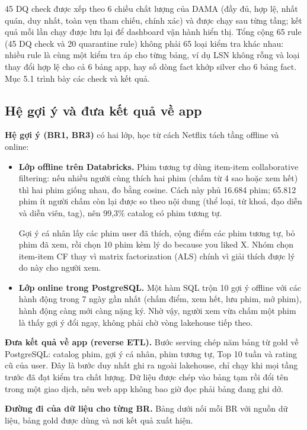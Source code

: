 \documentclass[a4paper,11pt]{article}
\begin{document}
45 DQ check được xếp theo 6 chiều chất lượng của DAMA (đầy đủ, hợp lệ, nhất quán, duy nhất, toàn vẹn tham chiếu, chính xác) và được chạy sau từng tầng; kết quả mỗi lần chạy được lưu lại để dashboard vận hành hiển thị. Tổng cộng 65 rule (45 DQ check và 20 quarantine rule) không phải 65 loại kiểm tra khác nhau: nhiều rule là cùng một kiểm tra áp cho từng bảng, ví dụ LSN không rỗng và loại thay đổi hợp lệ cho cả 6 bảng app, hay số dòng fact khớp silver cho 6 bảng fact. Mục 5.1 trình bày các check và kết quả.

\subsection{Hệ gợi ý và đưa kết quả về app}\label{sec:3.6}

\textbf{Hệ gợi ý (BR1, BR3)} có hai lớp, học từ cách Netflix tách tầng offline và online:

\begin{itemize}
  \item \textbf{Lớp offline trên Databricks.} Phim tương tự dùng item-item collaborative filtering: nếu nhiều người cùng thích hai phim (chấm từ 4 sao hoặc xem hết) thì hai phim giống nhau, đo bằng cosine. Cách này phủ 16.684 phim; 65.812 phim ít người chấm còn lại được so theo nội dung (thể loại, từ khoá, đạo diễn và diễn viên, tag), nên 99,3\% catalog có phim tương tự.

  Gợi ý cá nhân lấy các phim user đã thích, cộng điểm các phim tương tự, bỏ phim đã xem, rồi chọn 10 phim kèm lý do \textquotedbl{}because you liked X\textquotedbl{}. Nhóm chọn item-item CF thay vì matrix factorization (ALS) chính vì giải thích được lý do này cho người xem.
  \item \textbf{Lớp online trong PostgreSQL.} Một hàm SQL trộn 10 gợi ý offline với các hành động trong 7 ngày gần nhất (chấm điểm, xem hết, lưu phim, mở phim), hành động càng mới càng nặng ký. Nhờ vậy, người xem vừa chấm một phim là thấy gợi ý đổi ngay, không phải chờ vòng lakehouse tiếp theo.
\end{itemize}

\textbf{Đưa kết quả về app (reverse ETL).} Bước serving chép năm bảng từ gold về PostgreSQL: catalog phim, gợi ý cá nhân, phim tương tự, Top 10 tuần và rating cũ của user. Đây là bước duy nhất ghi ra ngoài lakehouse, chỉ chạy khi mọi tầng trước đã đạt kiểm tra chất lượng. Dữ liệu được chép vào bảng tạm rồi đổi tên trong một giao dịch, nên web app không bao giờ đọc phải bảng đang ghi dở.

\textbf{Đường đi của dữ liệu cho từng BR.} Bảng dưới nối mỗi BR với nguồn dữ liệu, bảng gold được dùng và nơi kết quả xuất hiện.
\end{document}
